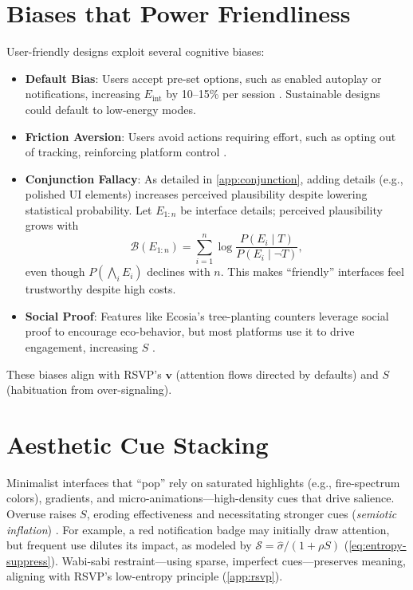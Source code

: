\documentclass[openany]{book}
\newcommand{\vvec}{\mathbf{v}} %
\newcommand{\Sent}{S} %
\newcommand{\Eint}{E_{\mathrm{int}}} %
\begin{document}
\section{Biases that Power Friendliness}
\label{sec:biases}
User-friendly designs exploit several cognitive biases:
\begin{itemize}
  \item \textbf{Default Bias}: Users accept pre-set options, such as enabled autoplay or notifications, increasing $\Eint$ by 10–15\% per session \citep{colak2024}. Sustainable designs could default to low-energy modes.
  \item \textbf{Friction Aversion}: Users avoid actions requiring effort, such as opting out of tracking, reinforcing platform control \citep{doctorow2022}.
  \item \textbf{Conjunction Fallacy}: As detailed in \cref{app:conjunction}, adding details (e.g., polished UI elements) increases perceived plausibility despite lowering statistical probability. Let $E_{1:n}$ be interface details; perceived plausibility grows with
  \begin{equation}
  \label{eq:believability}
  \mathcal{B}(E_{1:n}) = \sum_{i=1}^n \log\frac{P(E_i\mid T)}{P(E_i\mid \neg T)},
  \end{equation}
  even though $P(\bigwedge_i E_i)$ declines with $n$. This makes \enquote{friendly} interfaces feel trustworthy despite high costs.
  \item \textbf{Social Proof}: Features like Ecosia’s tree-planting counters leverage social proof to encourage eco-behavior, but most platforms use it to drive engagement, increasing $\Sent$ \citep{colak2024}.
\end{itemize}
These biases align with RSVP’s $\vvec$ (attention flows directed by defaults) and $\Sent$ (habituation from over-signaling).

\section{Aesthetic Cue Stacking}
\label{sec:aesthetic}
Minimalist interfaces that \enquote{pop} rely on saturated highlights (e.g., fire-spectrum colors), gradients, and micro-animations—high-density cues that drive salience. Overuse raises $\Sent$, eroding effectiveness and necessitating stronger cues (\emph{semiotic inflation}) \citep{colak2024}. For example, a red notification badge may initially draw attention, but frequent use dilutes its impact, as modeled by $\mathcal{S} = \widehat{\sigma}/(1+\rho \Sent)$ (\cref{eq:entropy-suppress}). Wabi-sabi restraint—using sparse, imperfect cues—preserves meaning, aligning with RSVP’s low-entropy principle (\cref{app:rsvp}).
\end{document}
